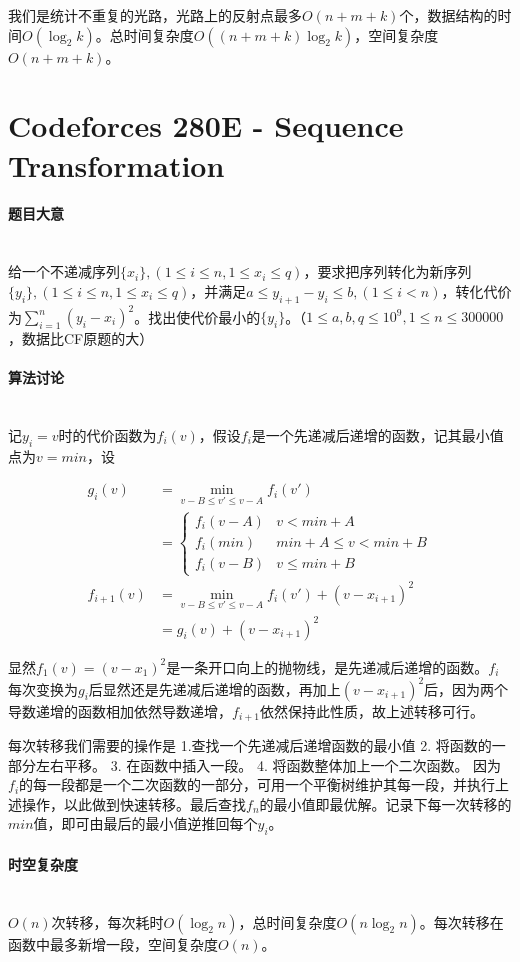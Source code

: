 \documentclass[UTF8]{ctexart}
\newcommand{\myparagraph}[1]{\paragraph{#1}\mbox{}\\}
\theoremstyle{nonumberplain}
\begin{document}
			我们是统计不重复的光路，光路上的反射点最多$O(n+m+k)$个，数据结构的时间$O(\log_2k)$。总时间复杂度$O((n+m+k)\log_2k)$，空间复杂度$O(n+m+k)$。
	
	\section{Codeforces 280E - Sequence Transformation}
	
		\myparagraph{题目大意}
		
			给一个不递减序列$\{x_i\},(1 \leq i \leq n, 1 \leq x_i \leq q)$，要求把序列转化为新序列$\{y_i\},(1 \leq i \leq n, 1 \leq x_i \leq q)$，并满足$a \leq y_{i+1}-y_i \leq b,(1 \leq i < n)$，转化代价为$\sum_{i=1}^n(y_i-x_i)^2$。找出使代价最小的$\{y_i\}$。（$1 \leq a,b,q \leq 10^9, 1 \leq n \leq 300000$，数据比CF原题的大）
		
		\myparagraph{算法讨论}
			
			记$y_i=v$时的代价函数为$f_i(v)$，假设$f_i$是一个先递减后递增的函数，记其最小值点为$v=min$，设
			
			$$\begin{aligned}
				g_i(v)&=\min_{v-B \leq v' \leq v-A}f_i(v')\\
				      &=\begin{cases}
				           f_i(v-A) & v < min+A \\
						   f_i(min) & min+A \leq v < min+B \\
						   f_i(v-B) & v \leq min+B
						\end{cases} \\
				f_{i+1}(v)&=\min_{v-B \leq v' \leq v-A}f_i(v')+(v-x_{i+1})^2 \\
				          &=g_i(v)+(v-x_{i+1})^2
			\end{aligned}$$
			
			显然$f_1(v)=(v-x_1)^2$是一条开口向上的抛物线，是先递减后递增的函数。$f_i$每次变换为$g_i$后显然还是先递减后递增的函数，再加上$(v-x_{i+1})^2$后，因为两个导数递增的函数相加依然导数递增，$f_{i+1}$依然保持此性质，故上述转移可行。
			
			每次转移我们需要的操作是 1.查找一个先递减后递增函数的最小值 2. 将函数的一部分左右平移。 3. 在函数中插入一段。 4. 将函数整体加上一个二次函数。 因为$f_i$的每一段都是一个二次函数的一部分，可用一个平衡树维护其每一段，并执行上述操作，以此做到快速转移。最后查找$f_n$的最小值即最优解。记录下每一次转移的$min$值，即可由最后的最小值逆推回每个$y_i$。
			
		\myparagraph{时空复杂度}
		
			$O(n)$次转移，每次耗时$O(\log_2n)$，总时间复杂度$O(n\log_2n)$。每次转移在函数中最多新增一段，空间复杂度$O(n)$。
	
\end{document}
